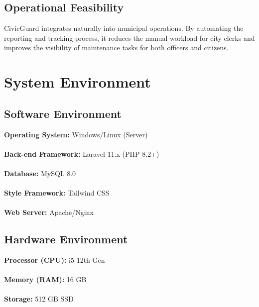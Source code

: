  \subsection{Operational Feasibility}
 CivicGuard integrates naturally into municipal operations. By automating the reporting and tracking process, it reduces the manual workload for city clerks and improves the visibility of maintenance tasks for both officers and citizens.
 
\section{System Environment}
 
 \subsection{Software Environment}
 \textbf{Operating System:} Windows/Linux (Server)\\\\
 \textbf{Back-end Framework:} Laravel 11.x (PHP 8.2+)\\\\
 \textbf{Database:} MySQL 8.0\\\\
 \textbf{Style Framework:} Tailwind CSS\\\\
 \textbf{Web Server:} Apache/Nginx

 \subsection{Hardware Environment}
 \textbf{Processor (CPU):} i5 12th Gen\\\\
 \textbf{Memory (RAM):} 16 GB\\\\
 \textbf{Storage:} 512 GB SSD
 
